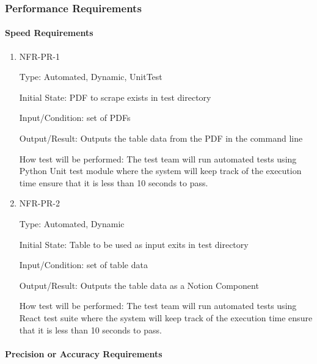 \documentclass[12pt, titlepage]{article}
\begin{document}
\subsubsection{Performance Requirements}
		
\paragraph{Speed Requirements}

\begin{enumerate}

\item{NFR-PR-1\\}

Type: Automated, Dynamic, UnitTest 

Initial State: PDF to scrape exists in test directory 

Input/Condition: set of PDFs 

Output/Result: Outputs the table data from the PDF in the command line 

How test will be performed: The test team will run automated tests using Python Unit test module where the system will keep track of the execution time ensure that it is less than 10 seconds to pass.

\item{NFR-PR-2\\}

Type: Automated, Dynamic 

Initial State: Table to be used as input exits in test directory 

Input/Condition: set of table data 

Output/Result: Outputs the table data as a Notion Component 

How test will be performed: The test team will run automated tests using React test suite where the system will keep track of the execution time ensure that it is less than 10 seconds to pass. 

\end{enumerate}

\paragraph{Precision or Accuracy Requirements}
\end{document}
